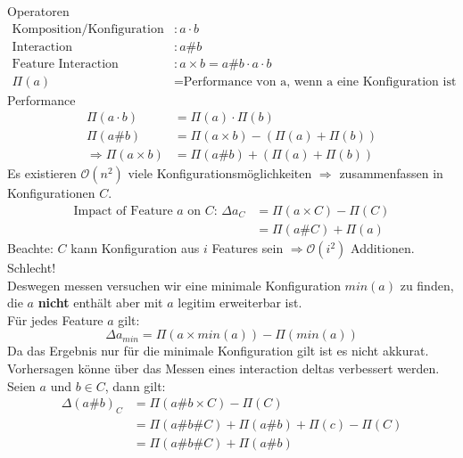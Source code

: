 \documentclass{article}
\begin{document}
Operatoren
\begin{align*}
\text{Komposition/Konfiguration} &:  a \cdot b\\
\text{Interaction} &: a\#b\\
\text{Feature Interaction} &: a\times b = a\#b \cdot a \cdot b\\
\Pi(a)  &= \text{Performance von a, wenn a eine Konfiguration ist} 
\end{align*}
Performance
\begin{align*}
	\Pi(a \cdot b) &= \Pi(a) \cdot \Pi(b)\\
	\Pi(a\#b) &= \Pi(a \times b) - (\Pi(a) + \Pi(b))\\
	\Rightarrow \Pi(a \times b) &=  \Pi(a\#b) + (\Pi(a) + \Pi(b))
\end{align*}
	Es existieren $\mathcal{O}(n^2)$ viele Konfigurationsmöglichkeiten $\Rightarrow$ zusammenfassen in Konfigurationen $C$.
\begin{align*}
\text{Impact  of Feature $a$ on $C$: } \Delta a_C &= \Pi(a \times C) - \Pi(C)\\
&= \Pi(a\#C) + \Pi(a)
\end{align*}
Beachte: $C$ kann Konfiguration aus $i$ Features sein $\Rightarrow \mathcal{O}(i^2)$ Additionen. Schlecht!\\ 
	Deswegen messen versuchen wir eine minimale Konfiguration  $min(a)$  zu finden, die $a$ \textbf{nicht} enthält aber mit $a$ legitim erweiterbar ist.\\
	Für jedes Feature $a$ gilt:
	\begin{equation*}
	\Delta a_{min} = \Pi(a \times min(a)) - \Pi(min(a))
	\end{equation*}
	Da das Ergebnis nur für die minimale Konfiguration gilt ist es nicht akkurat.
	Vorhersagen könne über das Messen eines interaction deltas verbessert werden.
	Seien $a$ und $b \in C$, dann gilt: 
	\begin{equation*}
	\begin{split}
	\Delta (a\#b)_C &= \Pi(a\#b \times C ) - \Pi(C)\\
					&= \Pi(a\#b\#C ) + \Pi(a\#b) + \Pi(c)  - \Pi(C)\\
					&= \Pi(a\#b\#C ) + \Pi(a\#b)
	\end{split}
	\end{equation*}
	
\end{document}
